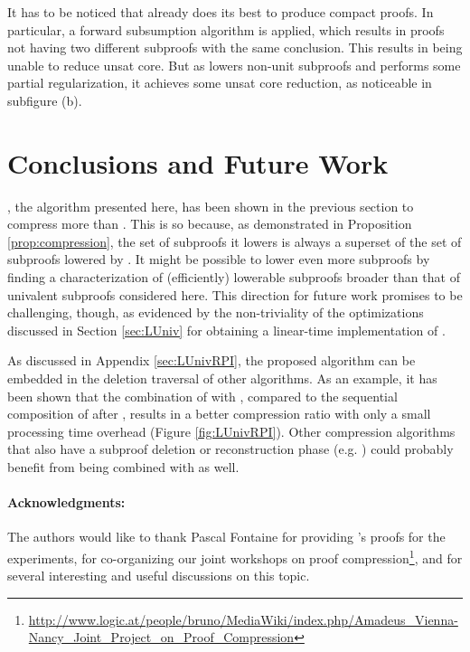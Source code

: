 \documentclass{easychair}
\begin{document}
It has to be noticed that \veriT already does its best to produce compact proofs. In particular,
a forward subsumption algorithm is applied, which results in proofs not having two different subproofs
with the same conclusion. This results in {\LowerUnits} being unable to reduce unsat core.
But as {\LowerUnivalents} lowers non-unit subproofs and performs some partial regularization, it
achieves some unsat core reduction, as noticeable in subfigure (b).


\section{Conclusions and Future Work}

{\LowerUnivalents}, the algorithm presented here, has been shown in the previous section to compress
more than {\LowerUnits}. This is so because, as demonstrated in Proposition \ref{prop:compression}, the
set of subproofs it lowers is always a superset of the set of subproofs lowered by {\LowerUnits}. It might
be possible to lower even more subproofs by finding a characterization of (efficiently) lowerable subproofs
broader than that of univalent subproofs considered here. This direction for future work promises to be challenging, though, as evidenced by the non-triviality of the optimizations discussed in Section \ref{sec:LUniv} for obtaining a linear-time implementation of {\LowerUnivalents}.

As discussed in Appendix \ref{sec:LUnivRPI}, the proposed algorithm can be embedded in the deletion traversal of other algorithms.  As
an example, it has been shown that the combination of {\LowerUnivalents} with {\RPI}, compared to
the sequential composition of {\LowerUnits} after {\RPI}, results in a better compression ratio with
only a small processing time overhead (Figure \ref{fig:LUnivRPI}). Other compression algorithms that also have a subproof
deletion or reconstruction phase (e.g. \ReduceReconstruct) could probably benefit from being combined with {\LowerUnivalents} as well.



\paragraph{Acknowledgments:}

The authors would like to thank Pascal Fontaine for providing {\veriT}'s proofs for the experiments,
for co-organizing our joint workshops on proof
compression\footnote{\url{http://www.logic.at/people/bruno/MediaWiki/index.php/Amadeus_Vienna-Nancy_Joint_Project_on_Proof_Compression}},
and for several interesting and useful discussions on this topic.
\end{document}
